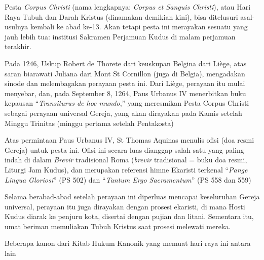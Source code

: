  
Pesta \textit{Corpus Christi} (nama lengkapnya: \textit{Corpus et Sanguis Christi}), atau Hari Raya Tubuh dan Darah Kristus (dinamakan demikian kini), bisa ditelusuri asal-usulnya kembali ke abad ke-13.
Akan tetapi pesta ini merayakan sesuatu yang jauh lebih tua: institusi Sakramen Perjamuan Kudus di malam perjamuan terakhir.

Pada 1246, Uskup Robert de Thorete dari keuskupan Belgina dari Liège, atas saran biarawati Juliana dari Mont St Cornillon (juga di Belgia), mengadakan sinode dan melembagakan perayaan pesta ini.
Dari Liège, perayaan itu mulai menyebar, dan, pada September 8, 1264, Paus Urbanus IV menerbitkan buku kepausan “\textit{Transiturus de hoc mundo},” yang meresmikan Pesta Corpus Christi sebagai perayaan universal Gereja, yang akan dirayakan pada Kamis setelah Minggu Trinitas (minggu pertama setelah Pentakosta)

Atas permintaan Paus Urbanus IV, St Thomas Aquinas menulis ofisi (doa resmi Gereja) untuk pesta ini.
Ofisi ini secara luas dianggap salah satu yang paling indah di dalam \textit{Brevir} tradisional Roma (\textit{brevir} tradisional = buku doa resmi, Liturgi Jam Kudus), dan merupakan referensi himne Ekaristi terkenal “\textit{Pange Lingua Gloriosi}” (PS 502) dan “\textit{Tantum Ergo Sacramentum}” (PS 558 dan 559)

Selama berabad-abad setelah perayaan ini diperluas mencapai keseluruhan Gereja universal, perayaan itu juga dirayakan dengan prosesi ekaristi, di mana Hosti Kudus diarak ke penjuru kota, disertai dengan pujian dan litani. Sementara itu, umat beriman memuliakan Tubuh Kristus saat prosesi melewati mereka.

Beberapa kanon dari Kitab Hukum Kanonik yang memuat hari raya ini antara lain

